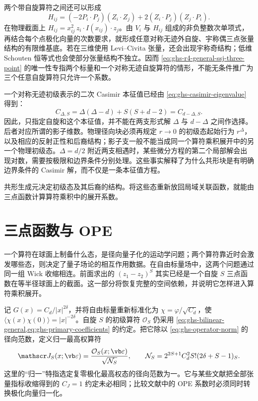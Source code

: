 两个带自旋算符之间还可以形成
\begin{equation}\label{eq:ghs-r4-embedding-H}
 H_{ij}=(-2P_i\cdot P_j)(Z_i\cdot Z_j)
 +2(Z_i\cdot P_j)(Z_j\cdot P_i).
\end{equation}
在物理截面上 $H_{ij}=x_{ij}^2\,z_i\cdot I(x_{ij})\cdot z_j$。由 $V_i$ 与 $H_{ij}$ 组成的非负整数次单项式，再结合每个点极化向量的次数要求，就形成任意对称无迹外自旋、宇称偶三点张量结构的有限维基底。若在三维使用 Levi--Civita 张量，还会出现宇称奇结构；低维 Schouten 恒等式也会使部分张量结构不独立。因而 \cref{eq:ghs-r4-general-ssj-three-point} 的唯一性专指两个标量和一个对称无迹自旋算符的情形，不能无条件推广为三个任意自旋算符只允许一个系数。


一个对称无迹初级表示的二次 Casimir 本征值已经由 \cref{eq:ghs-casimir-eigenvalue} 得到：
\begin{equation}\label{eq:ghs-r4-casimir-shadow-symmetry}
 C_{\Delta,S}=\Delta(\Delta-d)+S(S+d-2)
 =C_{d-\Delta,S}.
\end{equation}
因此，只指定自旋和这个本征值，并不能在两支形式解 $\Delta$ 与 $d-\Delta$ 之间作选择。后者对应所谓的影子维数。物理径向块必须再规定 $r\to0$ 的初级态起始行为 $r^\Delta$，以及相应的反射正性和后裔结构；影子支一般不能当成同一个算符乘积展开中的另一个物理初级态。$\Delta=d/2$ 附近两支相遇时，某些微分方程的第二个局部解会出现对数，需要按极限和边界条件分别处理。这些事实解释了为什么共形块是有明确边界条件的 Casimir 解，而不仅是一条本征值方程。


共形生成元决定初级态及其后裔的结构。将这些态重新放回局域关联函数，就能由三点函数计算算符乘积中的展开系数。


\section{三点函数与 OPE}
\label{sec:ghs-three-point-ope}


一个算符在球面上制备什么态，是径向量子化的运动学问题；两个算符靠近时会激发哪些态，则决定了量子场论的相互作用数据。在自由标量场中，这两个问题通过同一组 Wick 收缩相连。前面求出的 $(z_1-z_2)^S$ 其实已经是一个自旋 $S$ 三点函数在等半径球面上的截面。这一部分将恢复完整的空间依赖，并说明它怎样进入算符乘积展开。


记 $G(x)=C_d/|x|^{2\delta}$，并将自由标量重新标准化为 $\chi=\varphi/\sqrt{C_d}$，使 $\langle\chi(x)\chi(0)\rangle=|x|^{-2\delta}$。自旋 $S$ 的初级算符 $\mathcal O_S$ 仍采用 \cref{eq:ghs-bilinear-general,eq:ghs-primary-coefficients} 的约定。把它除以 \cref{eq:ghs-operator-norm} 的径向范数，定义归一最高权算符
\begin{equation}\label{eq:ghs-normalized-highest-current}
 \mathscr J_S(x;\vb\varepsilon)=\frac{\mathcal O_S(x;\vb\varepsilon)}{\sqrt{\mathcal N_S}},
 \qquad \mathcal N_S=2^{2S+1}C_d^2S!(2\delta+S-1)_S.
\end{equation}
这里的“归一”特指选定复零极化最高权态的径向范数为一。它与某些文献把全部张量指标收缩得到的 $C_J=1$ 约定未必相同；比较文献中的 OPE 系数时必须同时转换极化向量归一化。

